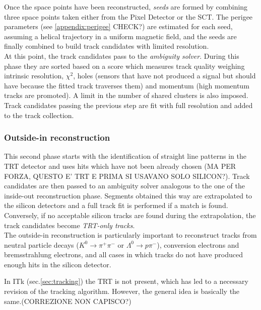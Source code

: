 \documentclass[a4paper,twoside,12pt]{article}
\begin{document}
Once the space points have been reconstructed, \textit{seeds} are formed by combining three space points taken either from the Pixel Detector or the SCT. The perigee parameters (see \ref{appendix:perigee} CHECK?) are estimated for each seed, assuming a helical trajectory in a 
uniform magnetic field, and the seeds are finally combined to build track candidates with limited resolution.\\

At this point, the track candidates pass to the \textit{ambiguity solver}. During this
phase they are sorted based on a score which measures track quality
weighing intrinsic resolution, $\chi^2$, holes (sensors that have not produced a signal but 
should have because the fitted track traverses them) and momentum (high momentum tracks are 
promoted). A limit in the number of shared clusters is also imposed. \\

Track candidates passing the previous step are fit with full resolution and added to the track collection.

\subsubsection*{Outside-in reconstruction}
This second phase starts with the identification of straight line patterns in the TRT detector
and uses hits which have not been already chosen (MA PER FORZA, QUESTO E' TRT E PRIMA SI USAVANO SOLO SILICON?). Track candidates are then passed to an ambiguity solver analogous to the one of the inside-out reconstruction phase. Segments obtained this way are extrapolated to the silicon detectors and a full track fit is performed if a match is found. Conversely, if no acceptable silicon tracks are found during 
the extrapolation, the track candidates become \textit{TRT-only tracks}. \\

The outside-in reconstruction is particularly important to reconstruct tracks from neutral particle decays ($K^0 \rightarrow \pi^+\pi^-$ or $\Lambda^0 \rightarrow p\pi^-$), conversion
electrons and bremsstrahlung electrons, and all cases in which tracks do not have
produced enough hits in the silicon detector. 

\bigskip
\bigskip
\bigskip

In ITk (sec.\ref{sec:tracking}) the TRT is not present, which has led to a necessary revision of the tracking algorithm. However, the general idea is basically the same\cite{Claudia}.(CORREZIONE NON CAPISCO?)
\end{document}
